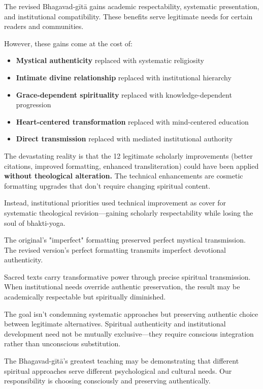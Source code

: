 \documentclass[12pt,twoside]{book}
\begin{document}
The revised Bhagavad-gītā gains academic respectability, systematic presentation, and institutional compatibility. These benefits serve legitimate needs for certain readers and communities.

However, these gains come at the cost of:
\begin{itemize}
\item \textbf{\textbf{Mystical authenticity}} replaced with systematic religiosity
\item \textbf{\textbf{Intimate divine relationship}} replaced with institutional hierarchy
\item \textbf{\textbf{Grace-dependent spirituality}} replaced with knowledge-dependent progression
\item \textbf{\textbf{Heart-centered transformation}} replaced with mind-centered education
\item \textbf{\textbf{Direct transmission}} replaced with mediated institutional authority
\end{itemize}

The devastating reality is that the 12 legitimate scholarly improvements (better citations, improved formatting, enhanced transliteration) could have been applied \textbf{\textbf{without theological alteration.}} The technical enhancements are cosmetic formatting upgrades that don't require changing spiritual content.

Instead, institutional priorities used technical improvement as cover for systematic theological revision—gaining scholarly respectability while losing the soul of bhakti-yoga.

The original's "imperfect" formatting preserved perfect mystical transmission. The revised version's perfect formatting transmits imperfect devotional authenticity.

Sacred texts carry transformative power through precise spiritual transmission. When institutional needs override authentic preservation, the result may be academically respectable but spiritually diminished.

The goal isn't condemning systematic approaches but preserving authentic choice between legitimate alternatives. Spiritual authenticity and institutional development need not be mutually exclusive—they require conscious integration rather than unconscious substitution.

The Bhagavad-gītā's greatest teaching may be demonstrating that different spiritual approaches serve different psychological and cultural needs. Our responsibility is choosing consciously and preserving authentically.
\end{document}

